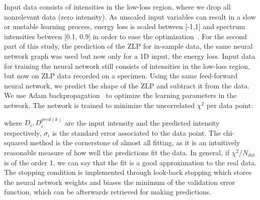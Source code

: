 %
Input data consists of intensities in the low-loss region, 
where we drop all nonrelevant data (zero intensity). As unscaled input variables
can result in a slow or unstable learning process,
energy loss is scaled between [-1,1] and spectrum intensities between [0.1, 0.9]
in order to ease the optimization~\cite{Ball:2008by}.
%
For the second part of this study, the prediction of the ZLP for in-sample data,
the same neural network graph was used but now only for a 1D input, the energy loss. 
%
Input data for training the neural network still consists of intensities in the low-loss region, 
but now on ZLP data recorded on a specimen. Using the same feed-forward neural network,
we predict the shape of the ZLP and subtract it from the data.
%
We use Adam backpropagation~\cite{Kingma:2017} to optimize the learning parameters in the network. 
The network is trained to minimize the uncorrelated $\chi^2$ per data point:



where $D_i, D_i^{pred(k)}$ are the input intensity and the predicted 
intensity respectively,
$\sigma_i$ is the standard error associated to the data point. 
%
The chi-squared method is the cornerstone of almost all fitting, as it is 
an intuitively reasonable measure of how well the predictions fit the data.
In general, if $\chi^2/N_{dat}$ is of the order 1, we can say that the fit is a 
good approximation to the real data. \\
%
The stopping condition is implemented through look-back stopping which stores 
the neural network weights and biases the minimum of the validation error function,  
which can be afterwards retrieved for 
making predictions.
%


